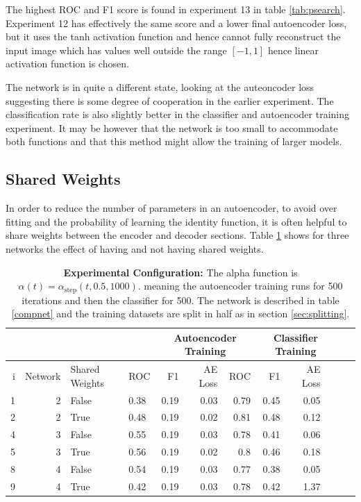       The highest ROC and F1 score is found in experiment 13 in table \ref{tab:psearch}. Experiment 12
      has effectively the same score and a lower final autoencoder loss, but it uses the tanh activation
      function and hence cannot fully reconstruct the input image which has values well outside the
      range $[-1,1]$ hence linear activation function is chosen.

      The network is in quite a different state, looking at the auteoncoder loss
      suggesting there is some degree of cooperation in the earlier experiment.
      The classification rate is also slightly better in the classifier and autoencoder
      training experiment. It may be however that the network is too small to accommodate both
      functions and that this method might allow the training of larger models.
      \newpage
    \subsection{Shared Weights}
      In order to reduce the number of parameters in an autoencoder, to avoid over fitting
      and the probability of learning the identity function, it is often helpful to share weights
      between the encoder and decoder sections.
      Table \ref{tab:sharedweights} shows
      for three networks the effect of having and not having shared weights.

      \begin{table}[!h] \centering
      {\footnotesize
      \begin{tabular}{rrllrrrrrrrr}
        &&&&   \multicolumn{3}{|c|}{Autoencoder Training} &  \multicolumn{3}{c|}{Classifier Training}    \\
      \hline
        i & Network               &   Shared Weights &    ROC&F1&AE Loss & ROC & F1 & AE Loss \\
      \hline
       1 & 2    & False     &    0.38 &   0.19 &     0.03 &    0.79 &   0.45 &     0.05 \\
       2 & 2    & True      &    0.48 &   0.19 &     0.02 &    0.81 &   0.48 &     0.12 \\
      \hline
      4 & 3    & False     &    0.55 &   0.19 &     0.03 &    0.78 &   0.41 &     0.06 \\
      5 & 3    & True      &    0.56 &   0.19 &     0.02 &    0.8  &   0.46 &     0.18 \\
      \hline
      8 & 4     & False     &    0.54 &   0.19 &     0.03 &    0.77 &   0.38 &     0.05 \\
      9 & 4     & True      &    0.42 &   0.19 &     0.03 &    0.78 &   0.42 &     1.37 \\
       \hline
      \end{tabular}}\caption{{\bf Experimental Configuration:}
      The alpha function is $\alpha(t)=\alpha_{\text{step}}(t,0.5,1000)$.
      meaning the autoencoder training runs for 500 iterations and then the classifier for 500.
      The network is described in table \ref{compnet} and the training datasets are split in half as in section
      \ref{sec:splitting}.} \label{tab:sharedweights} \end{table}

